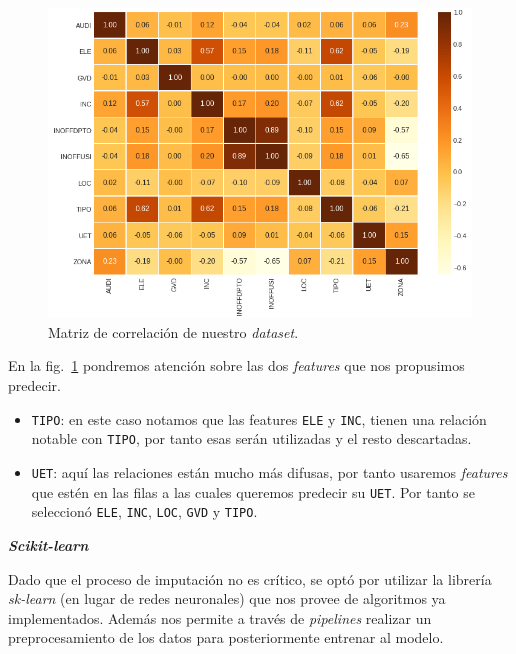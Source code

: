\documentclass[a4paper,12pt]{article}
\begin{document}
		\begin{figure}[H]
			\begin{center}
				\includegraphics[width=1\textwidth]{corrmatrix.png}
				\caption{Matriz de correlación de nuestro \textit{dataset}.}
				\label{fig:corrmatrix}
			\end{center}
		\end{figure}
		
		En la fig.~\ref{fig:corrmatrix} pondremos atención sobre las dos \textit{features} que nos propusimos predecir.
		
		\begin{itemize}[noitemsep, topsep=2pt]
			\item \texttt{TIPO}: en este caso notamos que las features \texttt{ELE} y \texttt{INC}, tienen una relación notable con \texttt{TIPO}, por tanto esas serán utilizadas y el resto descartadas.
			\item \texttt{UET}: aquí las relaciones están mucho más difusas, por tanto usaremos \textit{features} que estén en las filas a las cuales queremos predecir su \texttt{UET}. Por tanto se seleccionó \texttt{ELE}, \texttt{INC}, \texttt{LOC}, \texttt{GVD} y \texttt{TIPO}.
		\end{itemize}
		
		\textbf{\textit{Scikit-learn}}
		
		Dado que el proceso de imputación no es crítico, se optó por utilizar la librería \textit{sk-learn} (en lugar de redes neuronales) que nos provee de algoritmos ya implementados. Además nos permite a través de \textit{pipelines} realizar un preprocesamiento de los datos para posteriormente entrenar al modelo.
		
\end{document}
